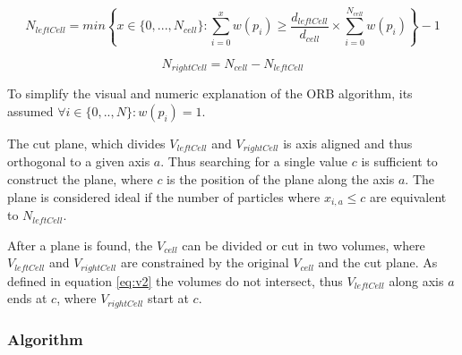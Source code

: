 \documentclass[]{article}
\begin{document}
\begin{center}
	\begin{equation}\label{eq:N1}
		N_{leftCell} = min \left \{ x \in \{0,...,N_{cell} \} : \sum_{i=0}^{x} w(p_i) \geq \frac{d_{leftCell}}{d_{cell}} \times \sum_{i=0}^{N_{cell}} w(p_i) \right \} - 1
	\end{equation}
\end{center}

\begin{center}
	\begin{equation}\label{eq:N2}
		N_{rightCell} = N_{cell} - N_{leftCell}
	\end{equation}
\end{center}

To simplify the visual and numeric explanation of the ORB algorithm, its assumed  $\forall i \in \{0,..,N\} : w(p_i) = 1$.

The cut plane, which divides $V_{leftCell}$ and $V_{rightCell}$ is axis aligned and thus orthogonal to a given axis $a$. Thus searching for a single value $c$ is sufficient to construct the plane, where $c$ is the position of the plane along the axis $a$. The plane is considered ideal if the number of particles where $x_{i,a} \leq c$ are equivalent to $N_{leftCell}$. 

After a plane is found, the $V_{cell}$ can be divided or cut in two volumes, where $V_{leftCell}$ and $V_{rightCell}$ are constrained by the original $V_{cell}$ and the cut plane. As defined in equation \ref{eq:v2} the volumes do not intersect, thus $V_{leftCell}$ along axis $a$ ends at $c$, where $V_{rightCell}$ start at $c$.
    
  
\subsubsection{Algorithm}
\end{document}
